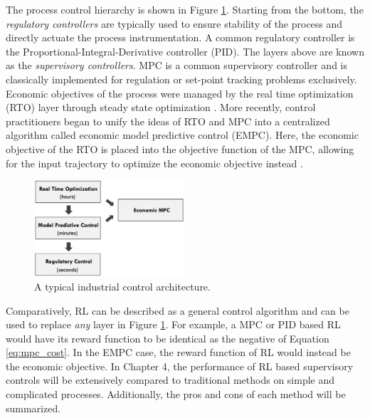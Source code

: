 The process control hierarchy is shown in Figure \ref{fig:rto_mpc_pid}. Starting from the bottom, the \textit{regulatory controllers} are typically used to ensure stability of the process and directly actuate the process instrumentation.  A common regulatory controller is the Proportional-Integral-Derivative controller (PID). The layers above are known as the \textit{supervisory controllers}. MPC is a common supervisory controller and is classically implemented for regulation or set-point tracking problems exclusively.  Economic objectives of the process were managed by the real time optimization (RTO) layer through steady state optimization \cite{rto}. More recently, control practitioners began to unify the ideas of RTO and MPC into a centralized algorithm called economic model predictive control (EMPC).  Here, the economic objective of the RTO is placed into the objective function of the MPC, allowing for the input trajectory to optimize the economic objective instead \cite{empc2, empc1}. 

\begin{figure}[H]
    \centering
    \includegraphics[width=0.5\textwidth]{images/ch1/rto_mpc_pid.jpeg}
    \caption{A typical industrial control architecture.}
    \label{fig:rto_mpc_pid}
\end{figure}

Comparatively, RL can be described as a general control algorithm and can be used to replace \textit{any} layer in Figure \ref{fig:rto_mpc_pid}. For example, a MPC or PID based RL would have its reward function to be identical as the negative of Equation \ref{eq:mpc_cost}.  In the EMPC case, the reward function of RL would instead be the economic objective.  In Chapter 4, the performance of RL based supervisory controls will be extensively compared to traditional methods on simple and complicated processes. Additionally, the pros and cons of each method will be summarized.